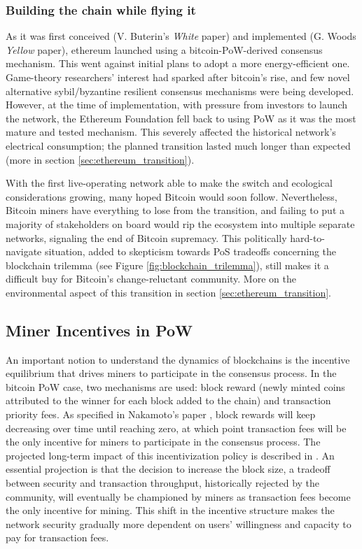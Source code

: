 \documentclass[11pt]{report}
\begin{document}
\subsubsection{Building the chain while flying it}
As it was first conceived (V. Buterin's \textit{White} paper) \cite{buterinEthereumNextgenerationSmart} and implemented (G. Woods \textit{Yellow} paper)\cite{woodEthereumSecuredDecentralised2023}, ethereum launched using a bitcoin-PoW-derived consensus mechanism. This went against initial plans to adopt a more energy-efficient one. Game-theory researchers' interest had sparked after bitcoin's rise, and few novel alternative sybil/byzantine resilient consensus mechanisms were being developed. However, at the time of implementation, with pressure from investors to launch the network, the Ethereum Foundation fell back to using PoW as it was the most mature and tested mechanism. This severely affected the historical network's electrical consumption; the planned transition lasted much longer than expected (more in section \ref{sec:ethereum_transition}).

With the first live-operating network able to make the switch and ecological considerations growing, many hoped Bitcoin would soon follow.  Nevertheless, Bitcoin miners have everything to lose from the transition, and failing to put a majority of stakeholders on board would rip the ecosystem into multiple separate networks, signaling the end of Bitcoin supremacy. This politically hard-to-navigate situation, added to skepticism towards PoS tradeoffs concerning the blockchain trilemma (see Figure \ref{fig:blockchain_trilemma}), still makes it a difficult buy for Bitcoin's change-reluctant community. More on the environmental aspect of this transition in section \ref{sec:ethereum_transition}.

\subsection{Miner Incentives in \ac{PoW}}

An important notion to understand the dynamics of blockchains is the incentive equilibrium that drives miners to participate in the consensus process. In the bitcoin \ac{PoW} case, two mechanisms are used: block reward (newly minted coins attributed to the winner for each block added to the chain) and transaction priority fees. As specified in Nakamoto's paper \cite{nakamotoBitcoinPeertopeerElectronic2008}, block rewards will keep decreasing over time until reaching zero, at which point transaction fees will be the only incentive for miners to participate in the consensus process. The projected long-term impact of this incentivization policy is described in \cite{easleyMiningMarketsEvolution2019}. An essential projection is that the decision to increase the block size, a tradeoff between security and transaction throughput, historically rejected by the community, will eventually be championed by miners as transaction fees become the only incentive for mining. This shift in the incentive structure makes the network security gradually more dependent on users' willingness and capacity to pay for transaction fees.
\end{document}
